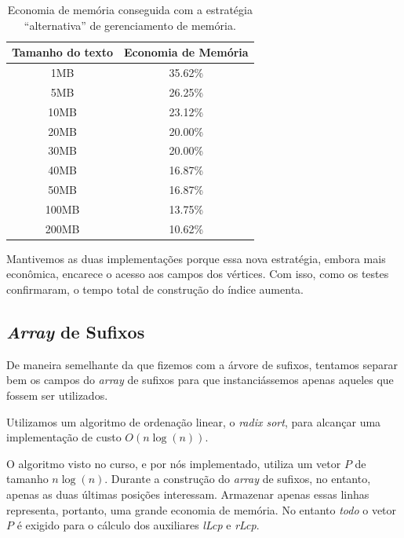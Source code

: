 \documentclass[]{article}
\begin{document}
\begin{table}
	\begin{center}
		\begin{tabular}{c|c}
			Tamanho do texto & Economia de Memória\\
			\hline
			1MB & 35.62\% \\
			5MB & 26.25\% \\
			10MB & 23.12\% \\
			20MB & 20.00\% \\
			30MB & 20.00\% \\
			40MB & 16.87\% \\
			50MB & 16.87\% \\
			100MB & 13.75\% \\
			200MB & 10.62\% \\
		\end{tabular}
		\caption{Economia de memória conseguida com a estratégia ``alternativa'' de gerenciamento de memória.}
		\label{tab:t1}
	\end{center}
\end{table}

Mantivemos as duas implementações porque essa nova estratégia, embora mais econômica, encarece o acesso aos campos dos vértices. Com isso, como os testes confirmaram, o tempo total de construção do índice aumenta.

\subsection{\textit{Array} de Sufixos}

De maneira semelhante da que fizemos com a árvore de sufixos, tentamos separar bem os campos do \textit{array} de sufixos para que instanciássemos apenas aqueles que fossem ser utilizados.

Utilizamos um algoritmo de ordenação linear, o \textit{radix sort}, para alcançar uma implementação de custo $O(n\log(n))$.

O algoritmo visto no curso, e por nós implementado, utiliza um vetor $P$ de tamanho $n\log(n)$. Durante a construção do \textit{array} de sufixos, no entanto, apenas as duas últimas posições interessam. Armazenar apenas essas linhas representa, portanto, uma grande economia de memória. No entanto \textit{todo} o vetor $P$ é exigido para o cálculo dos auxiliares \textit{lLcp} e \textit{rLcp}.
\end{document}
